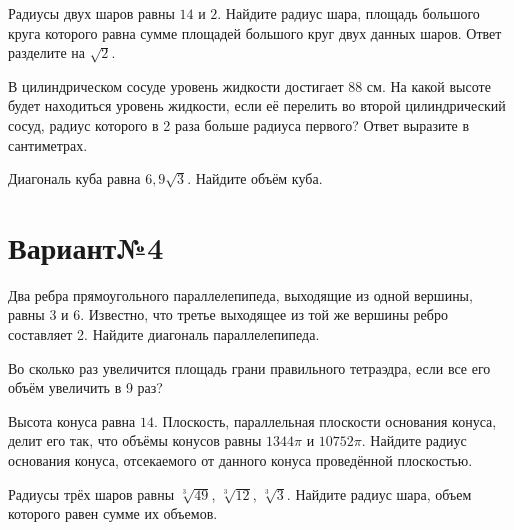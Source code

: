 \documentclass[4apaper]{article}
\begin{document}
\begin{taskBN}{4}
Радиусы двух шаров равны $14$ и $2$. Найдите радиус шара, площадь большого круга которого равна сумме площадей большого круг двух данных шаров. Ответ разделите на $\sqrt{2}$.
\end{taskBN}

\begin{taskBN}{5}
В цилиндрическом сосуде уровень жидкости достигает 88 см. На какой высоте будет находиться уровень жидкости, если её перелить во второй цилиндрический сосуд, радиус которого в 2 раза больше радиуса первого? Ответ выразите в сантиметрах.
\end{taskBN}

\begin{taskBN}{6}
Диагональ куба равна $6,9\sqrt{3}$. Найдите объём куба.
\end{taskBN}
\newpage\section*{Вариант№4}

\begin{taskBN}{1}
Два ребра прямоугольного параллелепипеда, выходящие из одной вершины, равны 3 и 6. Известно, что третье выходящее из той же вершины ребро составляет 2. Найдите диагональ параллелепипеда.
\end{taskBN}

\begin{taskBN}{2}
Во сколько раз увеличится площадь грани правильного тетраэдра, если все его объём увеличить в 9 раз?
\end{taskBN}

\begin{taskBN}{3}
Высота конуса равна $14$. Плоскость, параллельная плоскости основания конуса,  делит его так, что объёмы конусов равны $1344\pi$ и $10752\pi$. Найдите радиус основания конуса, отсекаемого от данного конуса проведённой плоскостью. 
\end{taskBN}

\begin{taskBN}{4}
Радиусы трёх шаров равны $\sqrt[3]{49}$, $\sqrt[3]{12}$, $\sqrt[3]{3}$. Найдите радиус шара, объем которого равен сумме их объемов.
\end{taskBN}
\end{document}
